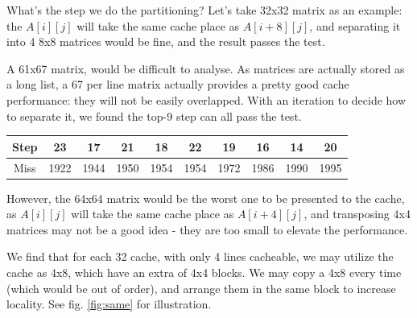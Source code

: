 \documentclass{article}
\begin{document}
What's the step we do the partitioning? Let's take 32x32 matrix as an example: the $A[i][j]$ will take the same cache place as $A[i+8][j]$, and separating it into 4 8x8 matrices would be fine, and the result passes the test.

A 61x67 matrix, would be difficult to analyse. As matrices are actually stored as a long list, a 67 per line matrix actually provides a pretty good cache performance: they will not be easily overlapped. With an iteration to decide how to separate it, we found the top-9 step can all pass the test.

\begin{table}[H]
    \centering
    \begin{tabular}{c|ccccccccc}
    \hline
    Step & 23   & 17   & 21   & 18   & 22   & 19   & 16   & 14   & 20   \\ \hline
    Miss & 1922 & 1944 & 1950 & 1954 & 1954 & 1972 & 1986 & 1990 & 1995 \\ \hline
    \end{tabular}
    \end{table}

However, the 64x64 matrix would be the worst one to be presented to the cache, as $A[i][j]$ will take the same cache place as $A[i+4][j]$, and transposing 4x4 matrices may not be a good idea - they are too small to elevate the performance.

We find that for each 32 cache, with only 4 lines cacheable, we may utilize the cache as 4x8, which have an extra of 4x4 blocks. We may copy a 4x8 every time (which would be out of order), and arrange them in the same block to increase locality. See fig. \ref{fig:same} for illustration.
\end{document}
